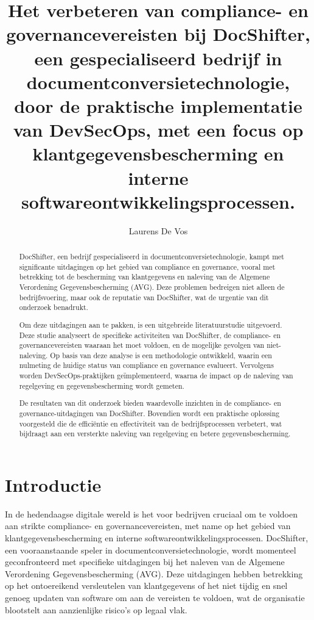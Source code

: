 \documentclass{hogent-article}
\title{Het verbeteren van compliance- en governancevereisten bij DocShifter, een gespecialiseerd bedrijf in documentconversietechnologie, door de praktische implementatie van DevSecOps, met een focus op klantgegevensbescherming en interne softwareontwikkelingsprocessen.}
\author{Laurens De Vos}
\begin{document}
    
    \begin{abstract}
    
    DocShifter, een bedrijf gespecialiseerd in documentconversietechnologie, kampt met significante uitdagingen op het gebied van compliance en governance, vooral met betrekking tot de bescherming van klantgegevens en naleving van de Algemene Verordening Gegevensbescherming (AVG). Deze problemen bedreigen niet alleen de bedrijfsvoering, maar ook de reputatie van DocShifter, wat de urgentie van dit onderzoek benadrukt.
    
    Om deze uitdagingen aan te pakken, is een uitgebreide literatuurstudie uitgevoerd. Deze studie analyseert de specifieke activiteiten van DocShifter, de compliance- en governancevereisten waaraan het moet voldoen, en de mogelijke gevolgen van niet-naleving. Op basis van deze analyse is een methodologie ontwikkeld, waarin een nulmeting de huidige status van compliance en governance evalueert. Vervolgens worden DevSecOps-praktijken geïmplementeerd, waarna de impact op de naleving van regelgeving en gegevensbescherming wordt gemeten.
    
    De resultaten van dit onderzoek bieden waardevolle inzichten in de compliance- en governance-uitdagingen van DocShifter. Bovendien wordt een praktische oplossing voorgesteld die de efficiëntie en effectiviteit van de bedrijfsprocessen verbetert, wat bijdraagt aan een versterkte naleving van regelgeving en betere gegevensbescherming.
    
    
    \end{abstract}
    
    \tableofcontents
    
    
    \section{Introductie}%
    \label{sec:introductie}

    In de hedendaagse digitale wereld is het voor bedrijven cruciaal om te voldoen aan strikte compliance- en governancevereisten, met name op het gebied van klantgegevensbescherming en interne softwareontwikkelingsprocessen. DocShifter, een vooraanstaande speler in documentconversietechnologie, wordt momenteel geconfronteerd met specifieke uitdagingen bij het naleven van de Algemene Verordening Gegevensbescherming (AVG). Deze uitdagingen hebben betrekking op het ontoereikend versleutelen van klantgegevens of het niet tijdig en snel genoeg updaten van software om aan de vereisten te voldoen, wat de organisatie blootstelt aan aanzienlijke risico's op legaal vlak.
    
\end{document}
